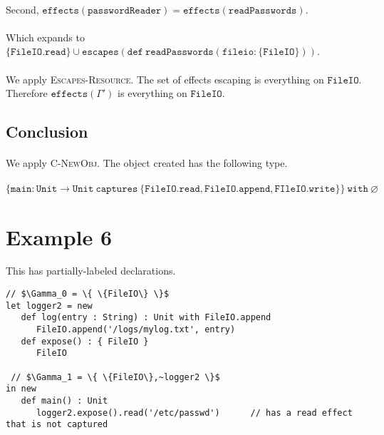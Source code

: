 \documentclass{llncs}
\newcommand{\keywadj}[1]{\mathtt{#1}}
\begin{document}
\paragraph{}
Second, $\keywadj{effects(passwordReader) = effects(readPasswords)}$.

\paragraph{}
Which expands to $\keywadj{\{ FileIO.read \} \cup escapes(def~ readPasswords(fileio : \{ FileIO \})) }$.

\paragraph{}
We apply \textsc{Escapes-Resource}. The set of effects escaping is everything on $\keywadj{ FileIO }$. Therefore $\keywadj{effects(\Gamma')}$ is everything on $\keywadj{ FileIO }$.

\subsection*{Conclusion}

\paragraph{}
We apply \textsc{C-NewObj}. The object created has the following type.

\paragraph{}
$\keywadj{ \{ main : Unit \rightarrow Unit~captures~\{FileIO.read, FileIO.append, FIleIO.write\} \}~with~\varnothing }$

\section{Example 6}

This has partially-labeled declarations.

\vspace{-6pt}
\begin{lstlisting}[xleftmargin=20pt]
// $\Gamma_0 = \{ \{FileIO\} \}$
let logger2 = new
   def log(entry : String) : Unit with FileIO.append
      FileIO.append('/logs/mylog.txt', entry)
   def expose() : { FileIO }
      FileIO
      
 // $\Gamma_1 = \{ \{FileIO\},~logger2 \}$
in new
   def main() : Unit
      logger2.expose().read('/etc/passwd')		// has a read effect that is not captured
\end{lstlisting}
\end{document}
